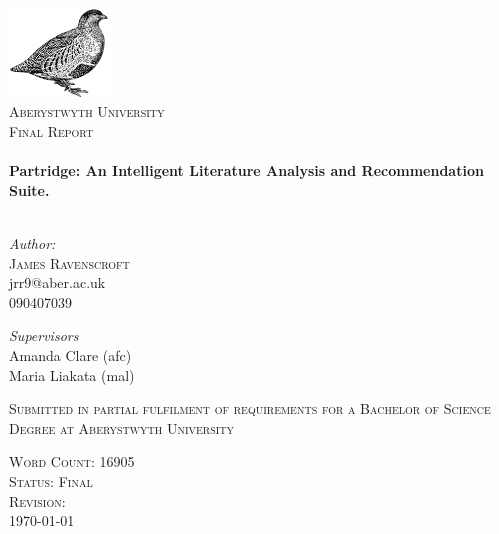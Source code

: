 \begin{titlepage}
 
\begin{center}

\includegraphics[width=0.20\textwidth]{../cover_logo.png}\\[1cm]


\textsc{\LARGE Aberystwyth University}\\[0.5cm]
\textsc{\LARGE Final Report}\\[0.5cm]



 
\HRule \\[0.4cm]
{ \huge \bfseries Partridge: An Intelligent Literature Analysis and
Recommendation Suite.}\\[0.4cm]

\HRule \\[1.5cm]

\begin{minipage}{0.4\textwidth}
\begin{flushleft} \large
\emph{Author:}\\
\textsc{James Ravenscroft}\\
jrr9@aber.ac.uk\\
090407039\\
\end{flushleft}
\end{minipage}
\begin{minipage}{0.4\textwidth}
\begin{flushright} \large
\emph{Supervisors} \\
Amanda Clare (afc)\\
Maria Liakata (mal)

\end{flushright}
\end{minipage}


\vfill

\textsc{Submitted in partial fulfilment of requirements for a Bachelor of
Science Degree at Aberystwyth University}



\vfill
 
\textsc{\large Word Count: 16905}\\
\textsc{\large Status: Final}\\
\textsc{\large Revision: \Revision{} }\\
{\large \today}
 
\end{center}

\frontmatter
 
\end{titlepage}

